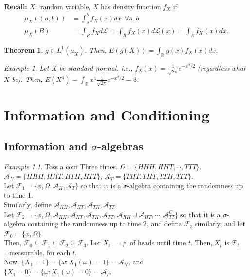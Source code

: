 \documentclass[12pt]{report}
\renewcommand{\subset}{\subseteq}
\theoremstyle{break}
\newtheorem{thm}{Theorem}[section] %
\theoremstyle{newdef}
\theoremstyle{remark}
\newtheorem*{exmp}{Example} %
\begin{document}
\textbf{Recall:} $X:$ random variable, $X$ has density function $f_X$ if
$$
\begin{aligned}
\mu_X((a,b)) &= \int_a^b f_X(x)dx \enspace \forall a,b.\\
\mu_X(B) &= \int_B f_Xd\mathcal{L} = \int_B f_X(x) d\mathcal{L}(x) = \int_B f_X(x)dx.
\end{aligned}
$$

\begin{thm}
$g \in L^1(\mu_X)$.
Then, $E(g(X)) = \int_\mathbb{R} g(x)f_X(x)dx$.

\begin{exmp}
Let $X$ be standard normal. i.e., $f_X(x) = \frac{1}{\sqrt{2\pi}}e^{-x^2/2}$ (regardless what $X$ be).
Then, $E(X^4) = \int_\mathbb{R} x^4 \frac{1}{\sqrt{2\pi}} e^{-x^2/2} = 3$.
\end{exmp}
\end{thm}



\chapter{Information and Conditioning}
\section{Information and $\sigma$-algebras}

\begin{exmp}
Toss a coin Three times.
$\Omega = \{ HHH, HHT, \cdots, TTT\}$.\\
$\mathcal{A}_H = \{ HHH, HHT, HTH, HTT\}$,
$\mathcal{A}_T = \{ THT, THT, TTH, TTT\}$.\\
Let $\mathcal{F}_1 = \{ \phi, \Omega, \mathcal{A}_H, \mathcal{A}_T\}$ so that
it is a $\sigma$-algebra containing the randomness up to time 1.\\
Similarly, define $\mathcal{A}_{HH}, \mathcal{A}_{HT}, \mathcal{A}_{TH}, \mathcal{A}_{TT}$.\\
Let $\mathcal{F}_2 = \{ \phi, \Omega, \mathcal{A}_{HH}, \mathcal{A}_{HT}, \mathcal{A}_{TH}, \mathcal{A}_{TT}, \mathcal{A}_{HH} \cup \mathcal{A}_{HT}, \cdots, \mathcal{A}_{TT}^C\}$
so that it is a $\sigma$-algebra containing the randomness up to time 2, and define $\mathcal{F}_3$ similarly, and let $\mathcal{F}_0 = \{ \phi, \Omega\}$.\\
Then, $\mathcal{F}_0 \subset \mathcal{F}_1 \subset \mathcal{F}_2 \subset \mathcal{F}_3$.
Let $X_t =$ \# of heads until time $t$.
Then, $X_t$ is $\mathcal{F}_t$=measurable. for each $t$.\\
Now, $\{ X_1 = 1\} = \{ \omega: X_1(\omega) = 1 \} = \mathcal{A}_H$, and $\{X_1 = 0\} = \{ \omega : X_1(\omega) = 0\} = \mathcal{A}_T$.
\end{exmp}
\end{document}
